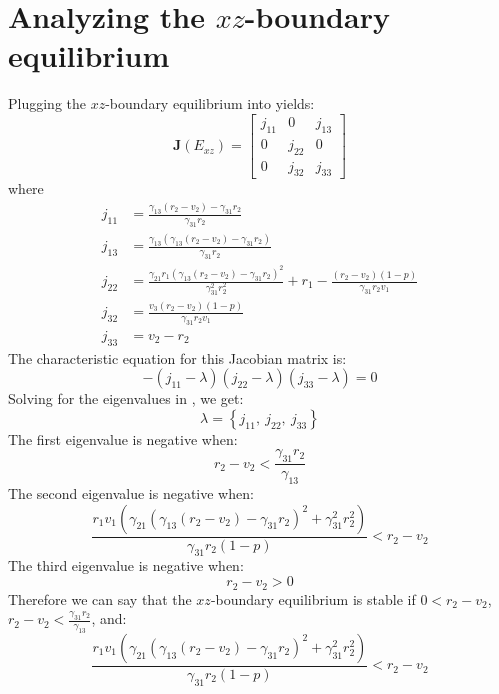 \section{Analyzing the $xz$-boundary equilibrium}\label{sec:stability_xz_boundary_equilibrium}
Plugging the $xz$-boundary equilibrium into  yields:
\begin{equation}
    \textbf{J}\left(E_{xz}\right)=\begin{bmatrix}
        j_{11} & 0 & j_{13}\\
        0 & j_{22} & 0\\
        0 & j_{32} & j_{33}
    \end{bmatrix}
    \label{eq:5.12}
\end{equation}
where
\begin{align*}
    j_{11} &= \frac{\gamma_{13}\left(r_2-v_2\right)-\gamma_{31}r_2}{\gamma_{31}r_2}\\
    j_{13} &= \frac{\gamma_{13}\left(\gamma_{13}\left(r_2-v_2\right)-\gamma_{31}r_2\right)}{\gamma_{31}r_2}\\
    j_{22} &= \frac{\gamma_{21}r_1\left(\gamma_{13}\left(r_2-v_2\right)-\gamma_{31}r_2\right)^2}{\gamma_{31}^2r_2^2}+r_1-\frac{\left(r_2-v_2\right)\left(1-p\right)}{\gamma_{31}r_2v_1}\\
    j_{32} &= \frac{v_3\left(r_2-v_2\right)\left(1-p\right)}{\gamma_{31}r_2v_1}\\
    j_{33} &= v_2-r_2
\end{align*}
The characteristic equation for this Jacobian matrix is:
\begin{equation}
    -\left(j_{11}-\lambda\right)\left(j_{22}-\lambda\right)\left(j_{33}-\lambda\right)=0
    \label{eq:5.13}
\end{equation}
Solving for the eigenvalues in , we get:
\[
\lambda=\left\{
j_{11},\ 
j_{22},\ 
j_{33}
\right\}
\]
The first eigenvalue is negative when:
\[
r_2-v_2<\frac{\gamma_{31}r_2}{\gamma_{13}}
\]
The second eigenvalue is negative when:
\[
\frac{r_1v_1\left(\gamma_{21}\left(\gamma_{13}\left(r_2-v_2\right)-\gamma_{31}r_2\right)^2+\gamma_{31}^2r_2^2\right)}{\gamma_{31}r_2\left(1-p\right)}<r_2-v_2
\]
The third eigenvalue is negative when:
\[
r_2-v_2>0
\]
Therefore we can say that the $xz$-boundary equilibrium is stable if $0<r_2-v_2$, $\displaystyle r_2-v_2<\frac{\gamma_{31}r_2}{\gamma_{13}}$, and:
\[
\frac{r_1v_1\left(\gamma_{21}\left(\gamma_{13}\left(r_2-v_2\right)-\gamma_{31}r_2\right)^2+\gamma_{31}^2r_2^2\right)}{\gamma_{31}r_2\left(1-p\right)}<r_2-v_2
\]


